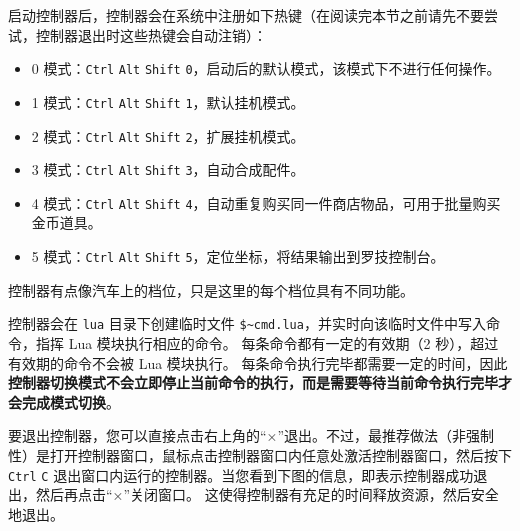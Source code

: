 启动控制器后，控制器会在系统中注册如下热键（在阅读完本节之前请先不要尝试，控制器退出时这些热键会自动注销）：

\begin{itemize}
    \item 0 模式：\lstinline{Ctrl} \lstinline{Alt} \lstinline{Shift} \lstinline{0}，启动后的默认模式，该模式下不进行任何操作。

    \item 1 模式：\lstinline{Ctrl} \lstinline{Alt} \lstinline{Shift} \lstinline{1}，默认挂机模式。

    \item 2 模式：\lstinline{Ctrl} \lstinline{Alt} \lstinline{Shift} \lstinline{2}，扩展挂机模式。

    \item 3 模式：\lstinline{Ctrl} \lstinline{Alt} \lstinline{Shift} \lstinline{3}，自动合成配件。

    \item 4 模式：\lstinline{Ctrl} \lstinline{Alt} \lstinline{Shift} \lstinline{4}，自动重复购买同一件商店物品，可用于批量购买金币道具。

    \item 5 模式：\lstinline{Ctrl} \lstinline{Alt} \lstinline{Shift} \lstinline{5}，定位坐标，将结果输出到罗技控制台。
\end{itemize}

控制器有点像汽车上的档位，只是这里的每个档位具有不同功能。

控制器会在 \lstinline{lua} 目录下创建临时文件 \lstinline{$~cmd.lua}，并实时向该临时文件中写入命令，指挥 Lua 模块执行相应的命令。
每条命令都有一定的有效期（2 秒），超过有效期的命令不会被 Lua 模块执行。
每条命令执行完毕都需要一定的时间，因此\textbf{\color{red}控制器切换模式不会立即停止当前命令的执行，而是需要等待当前命令执行完毕才会完成模式切换}。

要退出控制器，您可以直接点击右上角的“×”退出。不过，最推荐做法（非强制性）是打开控制器窗口，鼠标点击控制器窗口内任意处激活控制器窗口，然后按下 \lstinline{Ctrl} \lstinline{C} 退出窗口内运行的控制器。当您看到下图的信息，即表示控制器成功退出，然后再点击“×”关闭窗口。
这使得控制器有充足的时间释放资源，然后安全地退出。

